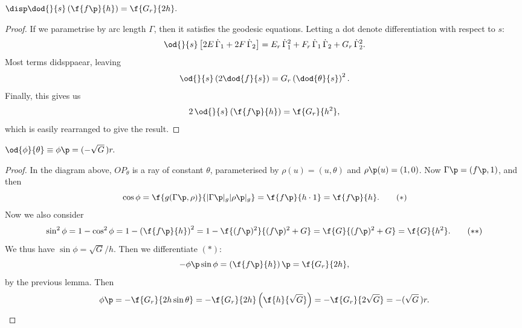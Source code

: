 \begin{lemma}
	$\disp \dod{}{s}\left( \f{f\p}{h} \right) = \f{G_r}{2h}.$
\end{lemma}

\begin{proof}
	If we parametrise by arc length $\Gamma$, then it satisfies the geodesic equations. Letting a dot denote differentiation with respect to $s$:
	\begin{equation*}
		\od{}{s}\left[ 2E\,\dGamma_1 + 2F\,\dGamma_2 \right] = E_r\,\dGamma_1^2 + F_r\,\dGamma_1 \, \dGamma_2 + G_r\,\dGamma_2^2.
	\end{equation*}
	Most terms didsppaear, leaving
	\begin{equation*}
		\od{}{s}\left( 2\dod{f}{s} \right) = G_r \left( \dod{\theta}{s} \right)^2.
	\end{equation*}
	Finally, this gives us
	\begin{equation*}
		2\,\od{}{s}\left( \f{f\p}{h} \right) = \f{G_r}{h^2},
	\end{equation*}
	which is easily rearranged to give the result.
\end{proof}

\begin{lemma}
	$\od{\phi}{\theta} \equiv \phi\p = (-\sqrt{G}\,)r.$
\end{lemma}

\begin{proof}
	In the diagram above, $OP_\theta$ is a ray of constant $\theta$, parameterised by $\rho(u) = (u,\theta)$ and $\rho\p(u) = (1,0)$. Now $\Gamma\p=(f\p,1)$, and then
	\begin{equation*}
		\cos \phi
		= \f{g(\Gamma\p, \rho)}{|\Gamma\p|_g |\rho\p|_g}
		= \f{f\p}{h \cdot 1}
		= \f{f\p}{h}. \tag{$*$}
	\end{equation*}
	Now we also consider
	\begin{equation*}
		\sin^2\phi
		= 1-\cos^2\phi
		= 1 - \left( \f{f\p}{h} \right)^2
		= 1-\f{(f\p)^2}{(f\p)^2 + G}
		= \f{G}{(f\p)^2 + G}
		= \f{G}{h^2}. \tag{$**$}
	\end{equation*}
	We thus have $\sin \phi = \sqrt{G}/h$. Then we differentiate $(*)$:
	\begin{equation*}
		-\phi\p \sin\phi = \left( \f{f\p}{h} \right)\p = \f{G_r}{2h},
	\end{equation*}
	by the previous lemma. Then
	\begin{equation*}
		\phi\p
		= -\f{G_r}{2h \sin\theta}
		= -\f{G_r}{2h} \left( \f{h}{\sqrt{G}} \right)
		= -\f{G_r}{2\sqrt{G}}
		= -(\sqrt{G}\,) r. \qedhere
	\end{equation*}
\end{proof}

